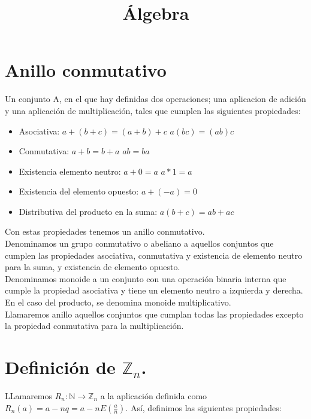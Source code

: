 \documentclass[11pt]{article}
\title{\textbf{Álgebra}}
\date{}
\begin{document}
\maketitle

\section{Anillo conmutativo}

Un conjunto A, en el que hay definidas dos operaciones; una aplicacion de adición y una aplicación de multiplicación, tales que cumplen las siguientes propiedades:
\begin{itemize}
\item Asociativa: $a+(b+c) = (a+b)+c$\hspace{1cm} $a(bc) = (ab)c$
\item Conmutativa: $a+b = b+a$ \hspace{1cm} $ab = ba$
\item Existencia elemento neutro: $a+0 = a$ \hspace{1cm} $a*1 = a$
\item Existencia del elemento opuesto: $a+(-a) = 0$
\item Distributiva del producto en la suma: $a(b+c) = ab+ ac$

\end{itemize}

Con estas propiedades tenemos un anillo conmutativo.\\

Denominamos un grupo conmutativo o abeliano a aquellos conjuntos que cumplen las propiedades asociativa, conmutativa y existencia de elemento neutro para la suma, y existencia de elemento opuesto.\\

Denominamos monoide a un conjunto con una operación binaria interna que cumple la propiedad asociativa y tiene un elemento neutro a izquierda y derecha. En el caso del producto, se denomina monoide multiplicativo.\\

Llamaremos anillo aquellos conjuntos que cumplan todas las propiedades excepto la propiedad conmutativa para la multiplicación.\\

\section{Definición de $\mathbb{Z}_{n}$.}

LLamaremos $R_n:\mathbb{N} \rightarrow \mathbb{Z}_n$ a la aplicación definida como $R_n(a) = a - nq = a- nE(\frac{a}{n})$. Así, definimos las siguientes propiedades:
\end{document}
